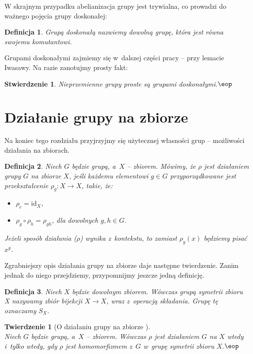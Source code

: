 \documentclass[licencjacka]{pracamgr}
\newtheorem{deff}{Definicja}[section]
\newtheorem{thh}{Twierdzenie}[section]
\newtheorem{fact}{Stwierdzenie}[section]
\begin{document}
W skrajnym przypadku abelianizacja grupy jest trywialna, co prowadzi do ważnego pojęcia
grupy doskonałej:

\begin{deff}
    \emph{Grupą doskonałą} nazwiemy dowolną grupę, która jest równa swojemu komutantowi.
\end{deff}

Grupami doskonałymi zajmiemy się w~dalszej części pracy -- przy
lemacie Iwasawy. Na razie zanotujmy prosty fakt:

\begin{fact}
    Nieprzemienne grupy proste są grupami doskonałymi.\quad$\eop$
\end{fact}


\section{Działanie grupy na zbiorze}
Na koniec tego rozdziału przyjrzyjmy się użytecznej
własności grup -- możliwości działania na zbiorach.

\begin{deff}
    Niech $G$ będzie grupą, a~$X$ -- zbiorem. Mówimy, że \emph{$\rho$ jest działaniem grupy $G$ na zbiorze $X$},
    jeśli każdemu elementowi $g \in G$ przyporządkowane jest przekształcenie $\rho_g\colon X \to X$, takie, że:
    \begin{itemize}
        \item $\rho_e = \mathrm{id}_X$,
        \item $\rho_g \circ \rho_h = \rho_{gh}$, dla dowolnych $g, h \in G$.
    \end{itemize}
    Jeżeli sposób działania ($\rho$) wynika z~kontekstu, to zamiast $\rho_g(x)$ będziemy pisać $x^g$.
\end{deff}

Zgrabniejszy opis działania grupy na zbiorze daje następne
twierdzenie. Zanim jednak do niego przejdziemy, przypomnijmy
jeszcze jedną definicję.

\begin{deff}
    Niech $X$ będzie dowolnym zbiorem. Wówczas \emph{grupą symetrii zbioru X} nazywamy zbiór bijekcji $X \to X$,
    wraz z~operacją składania. Grupę tę oznaczamy $S_X$.
\end{deff}

\begin{thh}[{O działaniu grupy na zbiorze \cite[str. 79]{BB}}] $ $\\
    Niech $G$ będzie grupą, a~$X$ -- zbiorem. Wówczas $\rho$ jest działaniem $G$ na $X$ wtedy i~tylko wtedy,
    gdy $\rho$ jest homomorfizmem z~$G$ w~grupę symetrii zbioru $X$.\quad$\eop$
\end{thh}
\end{document}
